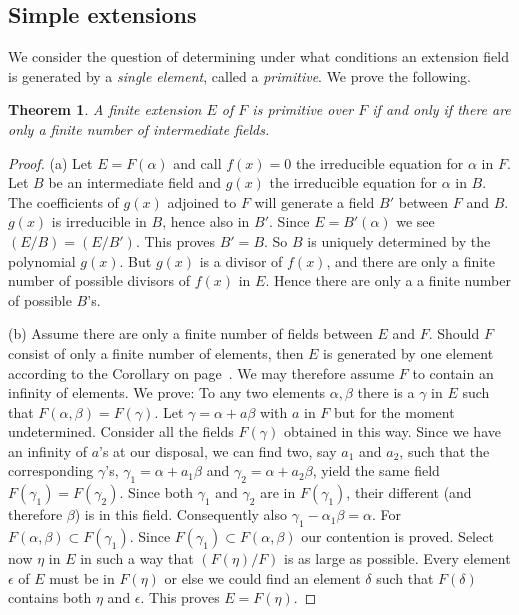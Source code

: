 \documentclass[10pt,leqno]{article}
\newtheorem{theo}{Theorem}
\theoremstyle{definition}
\begin{document}
\subsection{Simple extensions}

We consider the question of determining under what conditions an extension field is generated by a \emph{single element}, called a \emph{primitive}.
We prove the following.


\begin{theo}
\label{theo:26}
A finite extension $E$ of $F$ is primitive over $F$ if and only if there are only a finite number of intermediate fields.
\end{theo}


\begin{proof}
(a)\quad
Let $E = F(\alpha)$ and call $f(x) = 0$ the irreducible equation for $\alpha$ in $F$.
Let $B$ be an intermediate field and $g(x)$ the irreducible equation for $\alpha$ in $B$.
The coefficients of $g(x)$ adjoined to $F$ will generate a field $B'$ between $F$ and $B$.
$g(x)$ is irreducible in $B$, hence also in $B'$.
Since $E = B'(\alpha)$ we see $(E/B) = (E/B')$.
This proves $B' = B$.
So $B$ is uniquely determined by the polynomial $g(x)$.
But $g(x)$ is a divisor of $f(x)$, and there are only a finite number of possible divisors of $f(x)$ in $E$.
Hence there are only a a finite number of possible $B$'s.

(b)\quad
Assume there are only a finite number of fields between $E$ and $F$.
Should $F$ consist of only a finite number of elements, then $E$ is generated by one element according to the Corollary on page~\pageref{coro:p53}.
We may therefore assume $F$ to contain an infinity of elements.
We prove:
To any two elements $\alpha,\beta$ there is a $\gamma$ in $E$ such that $F(\alpha,\beta) = F(\gamma)$.
Let $\gamma = \alpha + a \beta$ with $a$ in $F$ but for the moment undetermined.
Consider all the fields $F(\gamma)$ obtained in this way.
Since we have an infinity of $a$'s at our disposal, we can find two, say $a_1$ and $a_2$, such that the corresponding $\gamma$'s, $\gamma_1 = \alpha + a_1 \beta$ and $\gamma_2 = \alpha + a_2 \beta$, yield the same field $F(\gamma_1) = F(\gamma_2)$.
Since both $\gamma_1$ and $\gamma_2$ are in $F(\gamma_1)$, their different (and therefore $\beta$) is in this field.
Consequently also $\gamma_1 - \alpha_1 \beta = \alpha$.
For $F(\alpha,\beta) \subset F(\gamma_1)$.
Since $F(\gamma_1) \subset F(\alpha,\beta)$ our contention is proved.
Select now $\eta$ in $E$ in such a way that $(F(\eta) / F)$ is as large as possible.
Every element $\epsilon$ of $E$ must be in $F(\eta)$ or else we could find an element $\delta$ such that $F(\delta)$ contains both $\eta$ and $\epsilon$.
This proves $E = F(\eta)$.
\end{proof}
\end{document}

